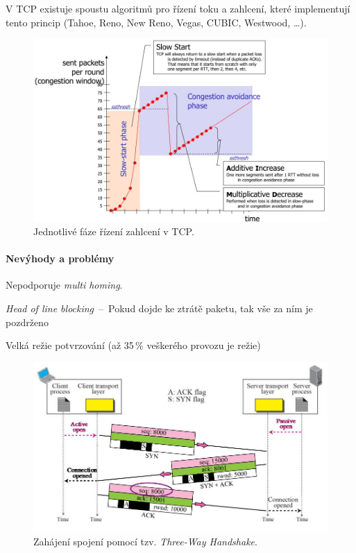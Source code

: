 \noindent V TCP existuje spoustu algoritmů pro řízení toku a zahlcení, které implementují tento princip (Tahoe, Reno, New Reno, Vegas, CUBIC, Westwood, \dots).

\begin{figure}[H]
    \centering
    \includegraphics[width=1\linewidth]{ss_ca_ai_md.png}
    \caption{Jednotlivé fáze řízení zahlcení v TCP.}
\end{figure}

\paragraph*{Nevýhody a problémy} \begin{compactitem}
    \item Nepodporuje \textit{multi homing}.
    \item \textit{Head of line blocking}~--~Pokud dojde ke ztrátě paketu, tak vše za ním je pozdrženo
    \item Velká režie potvrzování (až 35\,\% veškerého provozu je režie)
\end{compactitem}

\begin{figure}[H]
    \centering
    \includegraphics[width=1\linewidth]{tcp_zahajeni_spojeni.png}
    \caption{Zahájení spojení pomocí tzv. \textit{Three-Way Handshake}.}
\end{figure}

